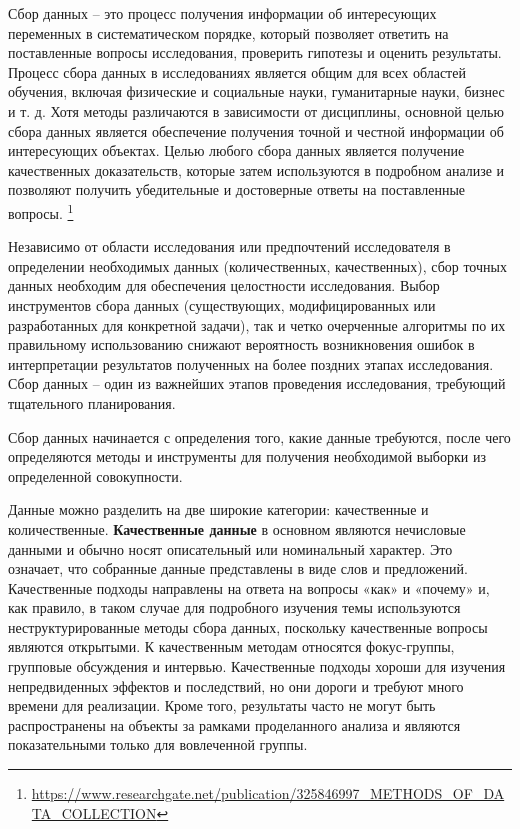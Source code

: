 \documentclass[12pt,a4paper, oneside]{extreport}
\begin{document}
Сбор данных -- это процесс получения информации об интересующих переменных в систематическом порядке, который позволяет ответить на поставленные вопросы исследования, проверить гипотезы и оценить результаты. Процесс сбора данных в исследованиях является общим для всех областей обучения, включая физические и социальные науки, гуманитарные науки, бизнес и т. д. Хотя методы различаются в зависимости от дисциплины, основной целью сбора данных является обеспечение получения точной и честной информации об интересующих объектах. Целью любого сбора данных является получение качественных доказательств, которые затем используются в подробном анализе и позволяют получить убедительные и достоверные ответы на поставленные вопросы. \footnote{\url{https://www.researchgate.net/publication/325846997_METHODS_OF_DATA_COLLECTION}}

Независимо от области исследования или предпочтений исследователя  в определении необходимых данных (количественных, качественных), сбор точных данных необходим для обеспечения  целостности исследования. Выбор инструментов сбора данных (существующих, модифицированных или разработанных для конкретной задачи), так и четко очерченные алгоритмы по их правильному использованию снижают вероятность возникновения ошибок в интерпретации результатов полученных на более поздних этапах исследования. Сбор данных – один из важнейших этапов проведения исследования, требующий тщательного планирования. 

Сбор данных начинается с определения того, какие данные требуются, после чего определяются методы и инструменты для получения необходимой выборки из определенной совокупности. 

Данные можно разделить на две широкие категории: качественные и количественные.
\textbf{Качественные данные} в основном являются  нечисловые данными  и обычно носят описательный или номинальный характер. Это означает, что собранные данные представлены в виде слов и предложений.  Качественные подходы направлены на ответа на вопросы «как» и «почему» и, как правило, в таком случае для подробного  изучения темы используются  неструктурированные методы сбора данных, поскольку  качественные вопросы являются открытыми. К качественным методам относятся фокус-группы, групповые обсуждения и интервью.
Качественные подходы хороши для изучения непредвиденных эффектов и  последствий, но они дороги и требуют много времени для реализации. Кроме того, результаты часто не могут быть распространены на объекты  за рамками проделанного анализа и являются показательными только  для вовлеченной группы. 
\end{document}
